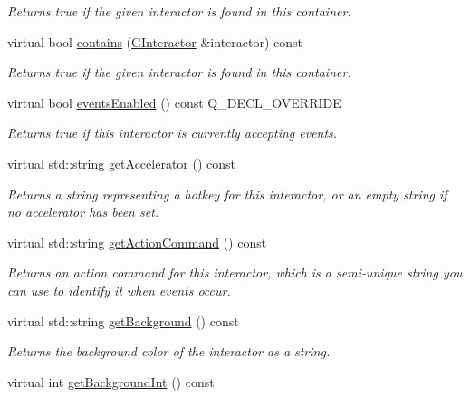 \begin{DoxyCompactItemize}
\begin{DoxyCompactList}\small\item\em Returns true if the given interactor is found in this container. \end{DoxyCompactList}\item 
virtual bool \mbox{\hyperlink{classGContainer_a62fe1c67f06f657fea8b9b28672516a0}{contains}} (\mbox{\hyperlink{classGInteractor}{G\+Interactor}} \&interactor) const
\begin{DoxyCompactList}\small\item\em Returns true if the given interactor is found in this container. \end{DoxyCompactList}\item 
virtual bool \mbox{\hyperlink{classGInteractor_ac05ba5b92e2e5146d416fe7f842a0969}{events\+Enabled}} () const Q\+\_\+\+D\+E\+C\+L\+\_\+\+O\+V\+E\+R\+R\+I\+DE
\begin{DoxyCompactList}\small\item\em Returns true if this interactor is currently accepting events. \end{DoxyCompactList}\item 
virtual std\+::string \mbox{\hyperlink{classGInteractor_a69f8d23ed8f207fbecad99960776e942}{get\+Accelerator}} () const
\begin{DoxyCompactList}\small\item\em Returns a string representing a hotkey for this interactor, or an empty string if no accelerator has been set. \end{DoxyCompactList}\item 
virtual std\+::string \mbox{\hyperlink{classGInteractor_a94eb4276000c4fdfb508ce9e6317a82a}{get\+Action\+Command}} () const
\begin{DoxyCompactList}\small\item\em Returns an action command for this interactor, which is a semi-\/unique string you can use to identify it when events occur. \end{DoxyCompactList}\item 
virtual std\+::string \mbox{\hyperlink{classGInteractor_a808e22cc1fdfbecf71ed8c64ef4600e0}{get\+Background}} () const
\begin{DoxyCompactList}\small\item\em Returns the background color of the interactor as a string. \end{DoxyCompactList}\item 
virtual int \mbox{\hyperlink{classGInteractor_a9e827257a55cb8cf4d9de2ec6bcfd7a0}{get\+Background\+Int}} () const

\end{DoxyCompactItemize}
